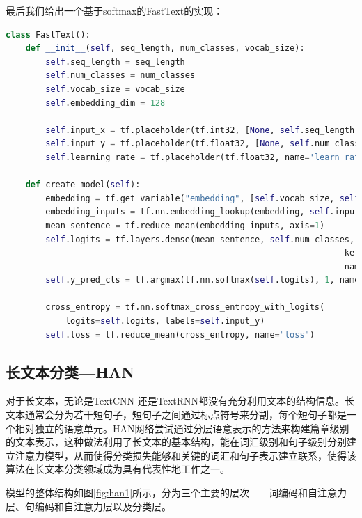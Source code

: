 \documentclass[twoside,a4paper,12pt]{book}%
\begin{document}
最后我们给出一个基于softmax的FastText的实现：
\begin{lstlisting}[language={Python}]
class FastText():
	def __init__(self, seq_length, num_classes, vocab_size):
		self.seq_length = seq_length
		self.num_classes = num_classes
		self.vocab_size = vocab_size
		self.embedding_dim = 128

		self.input_x = tf.placeholder(tf.int32, [None, self.seq_length], name='input_x')
		self.input_y = tf.placeholder(tf.float32, [None, self.num_classes], name='input_y')
		self.learning_rate = tf.placeholder(tf.float32, name='learn_rate')

	def create_model(self):
		embedding = tf.get_variable("embedding", [self.vocab_size, self.embedding_dim])
		embedding_inputs = tf.nn.embedding_lookup(embedding, self.input_x)
		mean_sentence = tf.reduce_mean(embedding_inputs, axis=1)
		self.logits = tf.layers.dense(mean_sentence, self.num_classes,
																	kernel_regularizer=tf.contrib.layers.l2_regularizer(0.001),
																	name='fc2')
		self.y_pred_cls = tf.argmax(tf.nn.softmax(self.logits), 1, name="pred")

		cross_entropy = tf.nn.softmax_cross_entropy_with_logits(
			logits=self.logits, labels=self.input_y)
		self.loss = tf.reduce_mean(cross_entropy, name="loss")

\end{lstlisting}

\subsection{长文本分类—HAN}
对于长文本，无论是TextCNN 还是TextRNN都没有充分利用文本的结构信息。长文本通常会分为若干短句子，短句子之间通过标点符号来分割，每个短句子都是一个相对独立的语意单元。\gls{HAN}网络尝试通过分层语意表示的方法来构建篇章级别的文本表示，这种做法利用了长文本的基本结构，能在词汇级别和句子级别分别建立注意力模型，从而使得分类损失能够和关键的词汇和句子表示建立联系，使得该算法在长文本分类领域成为具有代表性地工作之一。

模型的整体结构如图\ref{fig:han1}所示，分为三个主要的层次——词编码和自注意力层、句编码和自注意力层以及分类层。
\end{document}
